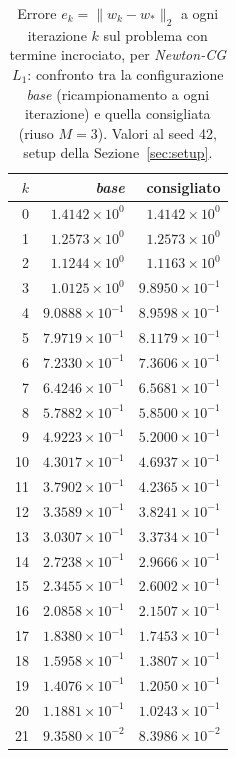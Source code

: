\begin{table}[H]
\centering
\footnotesize
\renewcommand{\arraystretch}{0.85}
\setlength{\tabcolsep}{8pt}
\caption{Errore $e_k=\|w_k-w_*\|_2$ a ogni iterazione $k$ sul problema con termine incrociato, per \emph{Newton-CG $L_1$}: confronto tra la configurazione \emph{base} (ricampionamento a ogni iterazione) e quella consigliata (riuso $M{=}3$). Valori al seed 42, setup della Sezione~\ref{sec:setup}.}
\label{tab:riuso_cons_offdiag_nl1}
\begin{tabular}{@{}rrr@{}}
\toprule
$k$ & \emph{base} & consigliato\\
\midrule
0 & $1.4142\times10^{0}$ & $1.4142\times10^{0}$\\
1 & $1.2573\times10^{0}$ & $1.2573\times10^{0}$\\
2 & $1.1244\times10^{0}$ & $1.1163\times10^{0}$\\
3 & $1.0125\times10^{0}$ & $9.8950\times10^{-1}$\\
4 & $9.0888\times10^{-1}$ & $8.9598\times10^{-1}$\\
5 & $7.9719\times10^{-1}$ & $8.1179\times10^{-1}$\\
6 & $7.2330\times10^{-1}$ & $7.3606\times10^{-1}$\\
7 & $6.4246\times10^{-1}$ & $6.5681\times10^{-1}$\\
8 & $5.7882\times10^{-1}$ & $5.8500\times10^{-1}$\\
9 & $4.9223\times10^{-1}$ & $5.2000\times10^{-1}$\\
10 & $4.3017\times10^{-1}$ & $4.6937\times10^{-1}$\\
11 & $3.7902\times10^{-1}$ & $4.2365\times10^{-1}$\\
12 & $3.3589\times10^{-1}$ & $3.8241\times10^{-1}$\\
13 & $3.0307\times10^{-1}$ & $3.3734\times10^{-1}$\\
14 & $2.7238\times10^{-1}$ & $2.9666\times10^{-1}$\\
15 & $2.3455\times10^{-1}$ & $2.6002\times10^{-1}$\\
16 & $2.0858\times10^{-1}$ & $2.1507\times10^{-1}$\\
17 & $1.8380\times10^{-1}$ & $1.7453\times10^{-1}$\\
18 & $1.5958\times10^{-1}$ & $1.3807\times10^{-1}$\\
19 & $1.4076\times10^{-1}$ & $1.2050\times10^{-1}$\\
20 & $1.1881\times10^{-1}$ & $1.0243\times10^{-1}$\\
21 & $9.3580\times10^{-2}$ & $8.3986\times10^{-2}$\\

\end{tabular}
\end{table}
